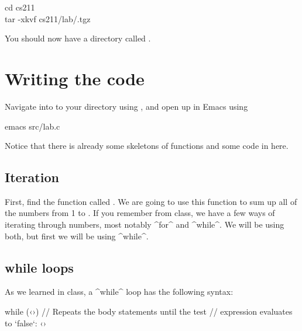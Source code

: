 \documentclass{tufte-handout}
\begin{document}
\begin{CmdLine*}
  \C cd cs211\\
  \C tar -xkvf \plaintilde cs211/lab/\ThisLabBase.tgz\\
\end{CmdLine*}

\noindent
You should now have a directory called
\filename{\ThisLabBase}.

\section{Writing the code}
Navigate into to your \filename{\ThisLabBase} directory using
, and open up  in Emacs using

\begin{CmdLine*}
  \C emacs src/lab.c\\
\end{CmdLine*}

\noindent
Notice that there is already some skeletons of functions and some code
in  here.

\subsection{Iteration}

First, find the function called
. We are going to use this function to sum up all of the numbers
from 1 to .  If you remember from class, we have a few ways
of iterating through numbers, most notably ^for^ and ^while^.  We will
be using both, but first we will be using ^while^.

\subsection{{\codestyleKeyword while} loops} As we learned in class, a  ^while^
loop has the following syntax:

\begin{Code}
    while (‹›) {
        // Repeats the body statements until the test
        // expression evaluates to `false`:
        ‹›
    }
\end{Code}
\end{document}

